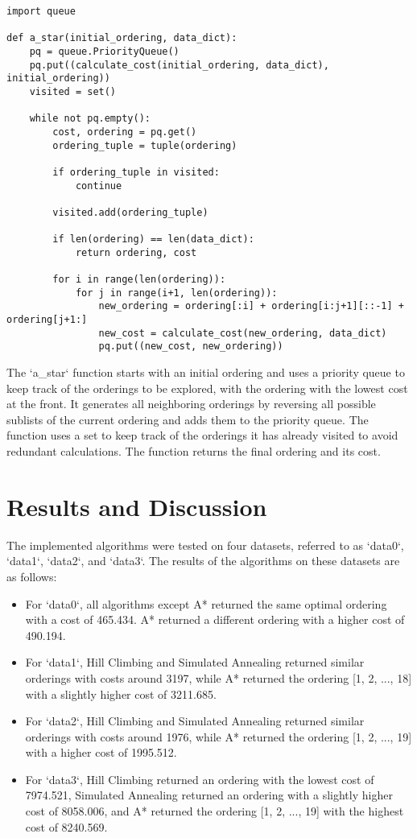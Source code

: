 \documentclass{article}
\begin{document}
\begin{verbatim}
import queue

def a_star(initial_ordering, data_dict):
    pq = queue.PriorityQueue()
    pq.put((calculate_cost(initial_ordering, data_dict), initial_ordering))
    visited = set()

    while not pq.empty():
        cost, ordering = pq.get()
        ordering_tuple = tuple(ordering)

        if ordering_tuple in visited:
            continue

        visited.add(ordering_tuple)

        if len(ordering) == len(data_dict):
            return ordering, cost

        for i in range(len(ordering)):
            for j in range(i+1, len(ordering)):
                new_ordering = ordering[:i] + ordering[i:j+1][::-1] + ordering[j+1:]
                new_cost = calculate_cost(new_ordering, data_dict)
                pq.put((new_cost, new_ordering))
\end{verbatim}

The `a\_star` function starts with an initial ordering and uses a priority queue to keep track of the orderings to be explored, with the ordering with the lowest cost at the front. It generates all neighboring orderings by reversing all possible sublists of the current ordering and adds them to the priority queue. The function uses a set to keep track of the orderings it has already visited to avoid redundant calculations. The function returns the final ordering and its cost.

\section{Results and Discussion}

The implemented algorithms were tested on four datasets, referred to as `data0`, `data1`, `data2`, and `data3`. The results of the algorithms on these datasets are as follows:

\begin{itemize}
\item For `data0`, all algorithms except A* returned the same optimal ordering with a cost of 465.434. A* returned a different ordering with a higher cost of 490.194.
\item For `data1`, Hill Climbing and Simulated Annealing returned similar orderings with costs around 3197, while A* returned the ordering [1, 2, ..., 18] with a slightly higher cost of 3211.685.
\item For `data2`, Hill Climbing and Simulated Annealing returned similar orderings with costs around 1976, while A* returned the ordering [1, 2, ..., 19] with a higher cost of 1995.512.
\item For `data3`, Hill Climbing returned an ordering with the lowest cost of 7974.521, Simulated Annealing returned an ordering with a slightly higher cost of 8058.006, and A* returned the ordering [1, 2, ..., 19] with the highest cost of 8240.569.
\end{itemize}
\end{document}
